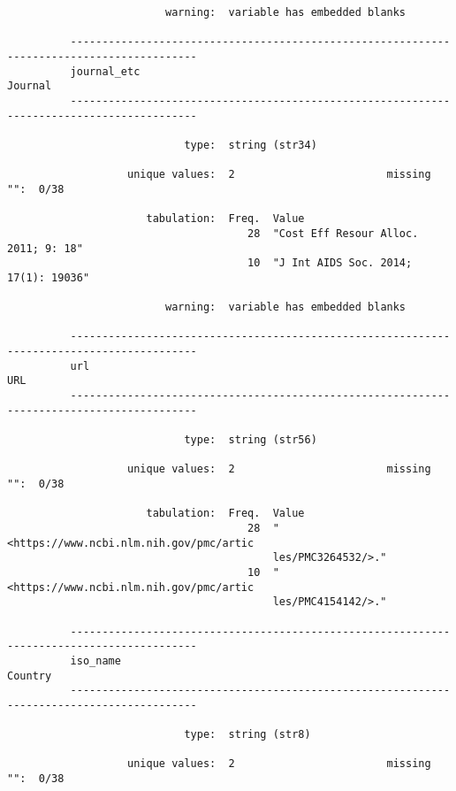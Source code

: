 \documentclass{article}
\begin{document}
\begin{verbatim}
                         warning:  variable has embedded blanks
          
          ------------------------------------------------------------------------------------------
          journal_etc                                                                        Journal
          ------------------------------------------------------------------------------------------
          
                            type:  string (str34)
          
                   unique values:  2                        missing "":  0/38
          
                      tabulation:  Freq.  Value
                                      28  "Cost Eff Resour Alloc. 2011; 9: 18"
                                      10  "J Int AIDS Soc. 2014; 17(1): 19036"
          
                         warning:  variable has embedded blanks
          
          ------------------------------------------------------------------------------------------
          url                                                                                    URL
          ------------------------------------------------------------------------------------------
          
                            type:  string (str56)
          
                   unique values:  2                        missing "":  0/38
          
                      tabulation:  Freq.  Value
                                      28  "<https://www.ncbi.nlm.nih.gov/pmc/artic
                                          les/PMC3264532/>."
                                      10  "<https://www.ncbi.nlm.nih.gov/pmc/artic
                                          les/PMC4154142/>."
          
          ------------------------------------------------------------------------------------------
          iso_name                                                                           Country
          ------------------------------------------------------------------------------------------
          
                            type:  string (str8)
          
                   unique values:  2                        missing "":  0/38
          

\end{verbatim}
\end{document}
